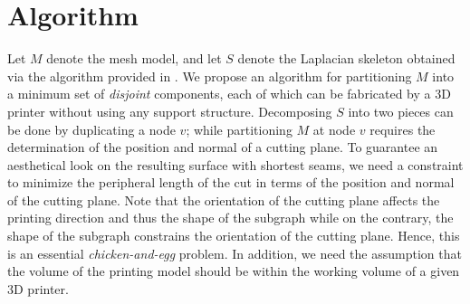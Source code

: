 \section{Algorithm}
Let $M$ denote the mesh model, and let $S$ denote the Laplacian skeleton obtained via the algorithm provided in \cite{AuTCCL08}. We propose an algorithm for partitioning $M$ into a minimum set of \emph{disjoint} components, each of which can be fabricated by a 3D printer without using any support structure. Decomposing $S$ into two pieces can be done by duplicating a node $v$; while partitioning $M$ at node $v$ requires the determination of the position and normal of a cutting plane. To guarantee an aesthetical look on the resulting surface with shortest seams, we need a constraint to minimize the peripheral length of the cut in terms of the position and normal of the cutting plane. Note that the orientation of the cutting plane affects the printing direction and thus the shape of the subgraph while on the contrary, the shape of the subgraph constrains the orientation of the cutting plane. Hence, this is an essential \emph{chicken-and-egg} problem. {In addition, we need the assumption that the volume of the printing model should be within the working volume of a given 3{D} printer.}

